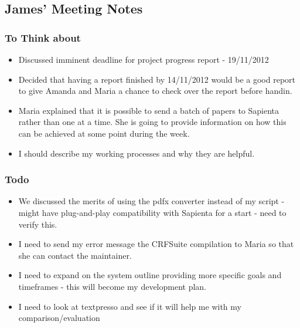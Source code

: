 \subsection{James' Meeting Notes}

\subsubsection{To Think about}

\begin{itemize}
\item
  Discussed imminent deadline for project progress report - 19/11/2012
\item
  Decided that having a report finished by 14/11/2012 would be a good
  report to give Amanda and Maria a chance to check over the report
  before handin.
\item
  Maria explained that it is possible to send a batch of papers to
  Sapienta rather than one at a time. She is going to provide
  information on how this can be achieved at some point during the week.
\item
  I should describe my working processes and why they are helpful.
\end{itemize}

\subsubsection{Todo}

\begin{itemize}
\item
  We discussed the merits of using the pdfx converter instead of my
  script - might have plug-and-play compatibility with Sapienta for a
  start - need to verify this.
\item
  I need to send my error message the CRFSuite compilation to Maria so
  that she can contact the maintainer.
\item
  I need to expand on the system outline providing more specific goals
  and timeframes - this will become my development plan.
\item
  I need to look at textpresso and see if it will help me with my
  comparison/evaluation
\end{itemize}
